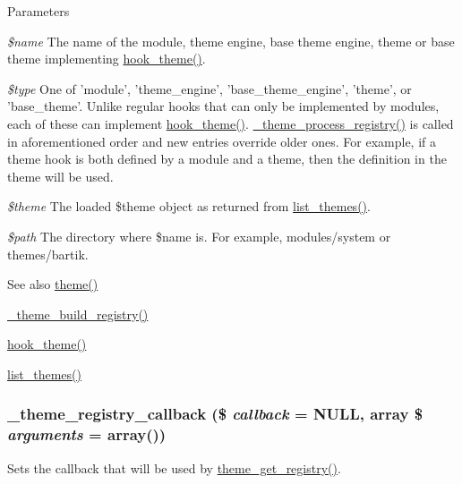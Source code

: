 \begin{DoxyParams}{Parameters}
\begin{DoxyItemize}
\end{DoxyItemize}\item[{\em \$name}]The name of the module, theme engine, base theme engine, theme or base theme implementing \hyperlink{group__hooks_ga013ccb45c7aaab1c16cf9691428c910d}{hook\_\-theme()}. \item[{\em \$type}]One of 'module', 'theme\_\-engine', 'base\_\-theme\_\-engine', 'theme', or 'base\_\-theme'. Unlike regular hooks that can only be implemented by modules, each of these can implement \hyperlink{group__hooks_ga013ccb45c7aaab1c16cf9691428c910d}{hook\_\-theme()}. \hyperlink{includes_2theme_8inc_a473fae348447b091f0d8e677820d30c3}{\_\-theme\_\-process\_\-registry()} is called in aforementioned order and new entries override older ones. For example, if a theme hook is both defined by a module and a theme, then the definition in the theme will be used. \item[{\em \$theme}]The loaded \$theme object as returned from \hyperlink{includes_2theme_8inc_a48d5521b10139d745626435d804353a4}{list\_\-themes()}. \item[{\em \$path}]The directory where \$name is. For example, modules/system or themes/bartik.\end{DoxyParams}
\begin{DoxySeeAlso}{See also}
\hyperlink{includes_2theme_8inc_a7c25609a935874541a19657affd30fff}{theme()} 

\hyperlink{includes_2theme_8inc_a4a1f9a033ff57b119d18697763909f3d}{\_\-theme\_\-build\_\-registry()} 

\hyperlink{group__hooks_ga013ccb45c7aaab1c16cf9691428c910d}{hook\_\-theme()} 

\hyperlink{includes_2theme_8inc_a48d5521b10139d745626435d804353a4}{list\_\-themes()} 
\end{DoxySeeAlso}
\hypertarget{includes_2theme_8inc_a7b2a2d8890b8af591d8f7760fb56ab02}{
\subsubsection[{\_\-theme\_\-registry\_\-callback}]{\setlength{\rightskip}{0pt plus 5cm}\_\-theme\_\-registry\_\-callback (\$ {\em callback} = {\ttfamily NULL}, \/  array \$ {\em arguments} = {\ttfamily array()})}}
\label{includes_2theme_8inc_a7b2a2d8890b8af591d8f7760fb56ab02}
Sets the callback that will be used by \hyperlink{includes_2theme_8inc_ae532c57b7a0288c1a359da1e2a70a0b1}{theme\_\-get\_\-registry()}.


